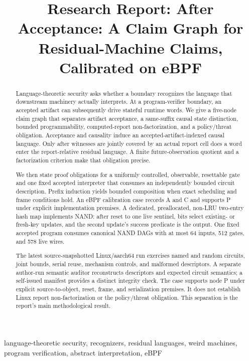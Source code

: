 \documentclass[conference]{IEEEtran}
\title{Research Report: After Acceptance: A Claim Graph for Residual-Machine Claims, Calibrated on eBPF}
\author{\IEEEauthorblockN{Author Name(s)}
\IEEEauthorblockA{Affiliation(s)\\Email address(es)}}
\begin{document}
\maketitle

\begin{abstract}
Language-theoretic security asks whether a boundary recognizes the language that downstream machinery actually interprets. At a program-verifier boundary, an accepted artifact can subsequently drive stateful runtime words. We give a five-node claim graph that separates artifact acceptance, a same-suffix causal state distinction, bounded programmability, computed-report non-factorization, and a policy/threat obligation. Acceptance and causality induce an accepted-artifact-indexed causal language. Only after witnesses are jointly covered by an actual report cell does a word enter the report-relative residual language. A finite future-observation quotient and a factorization criterion make that obligation precise.

We then state proof obligations for a uniformly controlled, observable, resettable gate and one fixed accepted interpreter that consumes an independently bounded circuit description. Prefix induction yields bounded composition when exact scheduling and frame conditions hold. An eBPF calibration case records A and C and supports P under explicit implementation premises. A dedicated, preallocated, non-LRU two-entry hash map implements NAND: after reset to one live sentinel, bits select existing- or fresh-key updates, and the second update's success predicate is the output. One fixed accepted program consumes canonical NAND DAGs with at most 64 inputs, 512 gates, and 578 live wires.

The latest source-snapshotted Linux/aarch64 run exercises named and random circuits, joint bounds, serial reuse, mechanism controls, and malformed descriptors. A separate author-run semantic auditor reconstructs descriptors and expected circuit semantics; a self-issued manifest provides a distinct integrity check. The case supports node P under explicit source-to-object, reset, frame, and serialization premises. It does not establish Linux report non-factorization or the policy/threat obligation. This separation is the report's main methodological result.
\end{abstract}

\begin{IEEEkeywords}
language-theoretic security, recognizers, residual languages, weird machines, program verification, abstract interpretation, eBPF
\end{IEEEkeywords}
\end{document}
